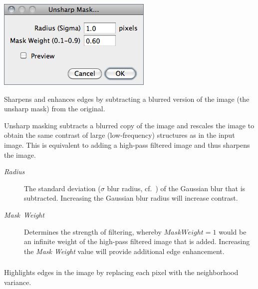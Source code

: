 \begin{minipage}[c][1\totalheight][t]{0.396\columnwidth}%
\includegraphics[scale=0.55]{images/UnsharpMask}%
\end{minipage}%
\begin{minipage}[c][1\totalheight][t]{0.604\columnwidth}%
Sharpens and enhances edges by subtracting a blurred version of the
image (the unsharp mask) from the original.\medskip{}


Unsharp masking subtracts a blurred copy of the image and rescales
the image to obtain the same contrast of large (low-frequency) structures
as in the input image. This is equivalent to adding a high-pass filtered
image and thus sharpens the image. %
\end{minipage}
\begin{description}
\item [{\emph{Radius}}] The standard deviation ($\sigma$ blur radius,
cf.\ ) of the Gaussian
blur that is subtracted. Increasing the Gaussian blur radius will
increase contrast.
\item [{\emph{Mask\ Weight}}] Determines the strength of filtering, whereby
$MaskWeight=1$ would be an infinite weight of the high-pass filtered
image that is added. Increasing the \emph{Mask Weight} value will
provide additional edge enhancement.
\end{description}

\subsubsection[\protect\userinterface{Variance\ldots{}}]{\protect{}\label{sub:Variance...}}

Highlights edges in the image by replacing each pixel with the neighborhood
variance.


\subsubsection{\protect{}\label{sub:Show-Circular-Masks...}}

